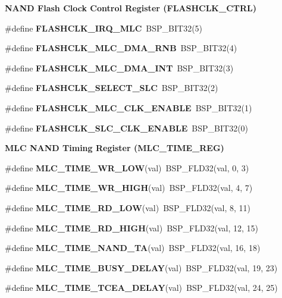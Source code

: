 \begin{Indent}\textbf{ N\+A\+ND Flash Clock Control Register (F\+L\+A\+S\+H\+C\+L\+K\+\_\+\+C\+T\+RL)}\par
\begin{DoxyCompactItemize}
\item 
\#define {\bfseries F\+L\+A\+S\+H\+C\+L\+K\+\_\+\+I\+R\+Q\+\_\+\+M\+LC}~B\+S\+P\+\_\+\+B\+I\+T32(5)
\item 
\#define {\bfseries F\+L\+A\+S\+H\+C\+L\+K\+\_\+\+M\+L\+C\+\_\+\+D\+M\+A\+\_\+\+R\+NB}~B\+S\+P\+\_\+\+B\+I\+T32(4)
\item 
\#define {\bfseries F\+L\+A\+S\+H\+C\+L\+K\+\_\+\+M\+L\+C\+\_\+\+D\+M\+A\+\_\+\+I\+NT}~B\+S\+P\+\_\+\+B\+I\+T32(3)
\item 
\#define {\bfseries F\+L\+A\+S\+H\+C\+L\+K\+\_\+\+S\+E\+L\+E\+C\+T\+\_\+\+S\+LC}~B\+S\+P\+\_\+\+B\+I\+T32(2)
\item 
\#define {\bfseries F\+L\+A\+S\+H\+C\+L\+K\+\_\+\+M\+L\+C\+\_\+\+C\+L\+K\+\_\+\+E\+N\+A\+B\+LE}~B\+S\+P\+\_\+\+B\+I\+T32(1)
\item 
\#define {\bfseries F\+L\+A\+S\+H\+C\+L\+K\+\_\+\+S\+L\+C\+\_\+\+C\+L\+K\+\_\+\+E\+N\+A\+B\+LE}~B\+S\+P\+\_\+\+B\+I\+T32(0)
\end{DoxyCompactItemize}
\end{Indent}
\begin{Indent}\textbf{ M\+LC N\+A\+ND Timing Register (M\+L\+C\+\_\+\+T\+I\+M\+E\+\_\+\+R\+EG)}\par
\begin{DoxyCompactItemize}
\item 
\#define {\bfseries M\+L\+C\+\_\+\+T\+I\+M\+E\+\_\+\+W\+R\+\_\+\+L\+OW}(val)~B\+S\+P\+\_\+\+F\+L\+D32(val, 0, 3)
\item 
\#define {\bfseries M\+L\+C\+\_\+\+T\+I\+M\+E\+\_\+\+W\+R\+\_\+\+H\+I\+GH}(val)~B\+S\+P\+\_\+\+F\+L\+D32(val, 4, 7)
\item 
\#define {\bfseries M\+L\+C\+\_\+\+T\+I\+M\+E\+\_\+\+R\+D\+\_\+\+L\+OW}(val)~B\+S\+P\+\_\+\+F\+L\+D32(val, 8, 11)
\item 
\#define {\bfseries M\+L\+C\+\_\+\+T\+I\+M\+E\+\_\+\+R\+D\+\_\+\+H\+I\+GH}(val)~B\+S\+P\+\_\+\+F\+L\+D32(val, 12, 15)
\item 
\#define {\bfseries M\+L\+C\+\_\+\+T\+I\+M\+E\+\_\+\+N\+A\+N\+D\+\_\+\+TA}(val)~B\+S\+P\+\_\+\+F\+L\+D32(val, 16, 18)
\item 
\#define {\bfseries M\+L\+C\+\_\+\+T\+I\+M\+E\+\_\+\+B\+U\+S\+Y\+\_\+\+D\+E\+L\+AY}(val)~B\+S\+P\+\_\+\+F\+L\+D32(val, 19, 23)
\item 
\#define {\bfseries M\+L\+C\+\_\+\+T\+I\+M\+E\+\_\+\+T\+C\+E\+A\+\_\+\+D\+E\+L\+AY}(val)~B\+S\+P\+\_\+\+F\+L\+D32(val, 24, 25)
\end{DoxyCompactItemize}
\end{Indent}
